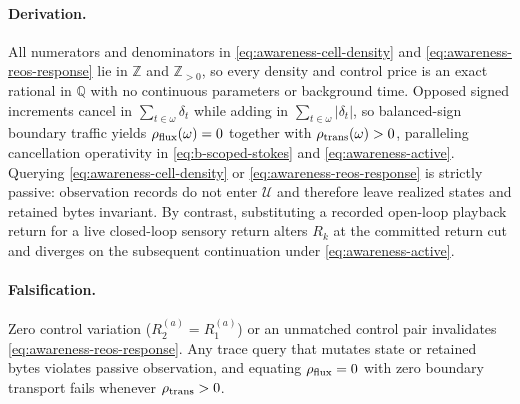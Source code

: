 \paragraph{Derivation.}
All numerators and denominators in \eqref{eq:awareness-cell-density} and
\eqref{eq:awareness-reos-response} lie in \(\mathbb Z\) and \(\mathbb Z_{>0}\),
so every density and control price is an exact rational in \(\mathbb Q\) with
no continuous parameters or background time. Opposed signed increments cancel
in \(\sum_{t\in\omega}\delta_t\) while adding in
\(\sum_{t\in\omega}|\delta_t|\), so balanced-sign boundary traffic yields
\(\rho_{\rm flux}(\omega)=0\) together with \(\rho_{\rm trans}(\omega)>0\),
paralleling cancellation operativity in \eqref{eq:b-scoped-stokes} and
\eqref{eq:awareness-active}. Querying \eqref{eq:awareness-cell-density} or
\eqref{eq:awareness-reos-response} is strictly passive: observation records do
not enter \(\mathcal U\) and therefore leave realized states and retained bytes
invariant. By contrast, substituting a recorded open-loop playback return for a
live closed-loop sensory return alters \(R_k\) at the committed return cut and
diverges on the subsequent continuation under \eqref{eq:awareness-active}.

\paragraph{Falsification.}
Zero control variation (\(R^{(a)}_2=R^{(a)}_1\)) or an unmatched control pair
invalidates \eqref{eq:awareness-reos-response}. Any trace query that mutates
state or retained bytes violates passive observation, and equating
\(\rho_{\rm flux}=0\) with zero boundary transport fails whenever
\(\rho_{\rm trans}>0\).

